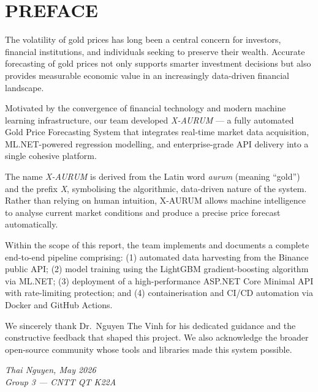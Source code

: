 \documentclass[13pt,a4paper]{article}
\begin{document}
\renewcommand{\contentsname}{\centering TABLE OF CONTENTS}
\tableofcontents
\newpage

\section*{PREFACE}

The volatility of gold prices has long been a central concern for investors, financial institutions, and individuals seeking to preserve their wealth. Accurate forecasting of gold prices not only supports smarter investment decisions but also provides measurable economic value in an increasingly data-driven financial landscape.

Motivated by the convergence of financial technology and modern machine learning infrastructure, our team developed \textit{X-AURUM} --- a fully automated Gold Price Forecasting System that integrates real-time market data acquisition, ML.NET-powered regression modelling, and enterprise-grade API delivery into a single cohesive platform.

The name \textit{X-AURUM} is derived from the Latin word \textit{aurum} (meaning ``gold'') and the prefix \textit{X}, symbolising the algorithmic, data-driven nature of the system. Rather than relying on human intuition, X-AURUM allows machine intelligence to analyse current market conditions and produce a precise price forecast automatically.

Within the scope of this report, the team implements and documents a complete end-to-end pipeline comprising: (1) automated data harvesting from the Binance public API; (2) model training using the LightGBM gradient-boosting algorithm via ML.NET; (3) deployment of a high-performance ASP.NET Core Minimal API with rate-limiting protection; and (4) containerisation and CI/CD automation via Docker and GitHub Actions.

We sincerely thank Dr.\ Nguyen The Vinh for his dedicated guidance and the constructive feedback that shaped this project. We also acknowledge the broader open-source community whose tools and libraries made this system possible.

\vspace{1cm}
\begin{flushright}
\textit{Thai Nguyen, May 2026}\\[0.3cm]
\textit{Group 3 --- CNTT QT K22A}
\end{flushright}
\newpage
\end{document}
